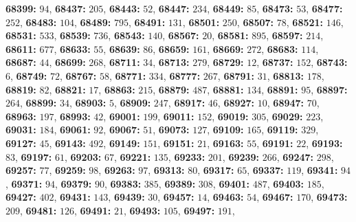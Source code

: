 \textsf{\bfseries 68399:} $94$, \textsf{\bfseries 68437:} $205$, \textsf{\bfseries 68443:} $52$, \textsf{\bfseries 68447:} $234$, \textsf{\bfseries 68449:} $85$, \textsf{\bfseries 68473:} $53$, \textsf{\bfseries 68477:} $252$, \textsf{\bfseries 68483:} $104$, \textsf{\bfseries 68489:} $795$, \textsf{\bfseries 68491:} $131$, \textsf{\bfseries 68501:} $250$, \textsf{\bfseries 68507:} $78$, \textsf{\bfseries 68521:} $146$, \textsf{\bfseries 68531:} $533$, \textsf{\bfseries 68539:} $736$, \textsf{\bfseries 68543:} $140$, \textsf{\bfseries 68567:} $20$, \textsf{\bfseries 68581:} $895$, \textsf{\bfseries 68597:} $214$, \textsf{\bfseries 68611:} $677$, \textsf{\bfseries 68633:} $55$, \textsf{\bfseries 68639:} $86$, \textsf{\bfseries 68659:} $161$, \textsf{\bfseries 68669:} $272$, \textsf{\bfseries 68683:} $114$, \textsf{\bfseries 68687:} $44$, \textsf{\bfseries 68699:} $268$, \textsf{\bfseries 68711:} $34$, \textsf{\bfseries 68713:} $279$, \textsf{\bfseries 68729:} $12$, \textsf{\bfseries 68737:} $152$, \textsf{\bfseries 68743:} $6$, \textsf{\bfseries 68749:} $72$, \textsf{\bfseries 68767:} $58$, \textsf{\bfseries 68771:} $334$, \textsf{\bfseries 68777:} $267$, \textsf{\bfseries 68791:} $31$, \textsf{\bfseries 68813:} $178$, \textsf{\bfseries 68819:} $82$, \textsf{\bfseries 68821:} $17$, \textsf{\bfseries 68863:} $215$, \textsf{\bfseries 68879:} $487$, \textsf{\bfseries 68881:} $134$, \textsf{\bfseries 68891:} $95$, \textsf{\bfseries 68897:} $264$, \textsf{\bfseries 68899:} $34$, \textsf{\bfseries 68903:} $5$, \textsf{\bfseries 68909:} $247$, \textsf{\bfseries 68917:} $46$, \textsf{\bfseries 68927:} $10$, \textsf{\bfseries 68947:} $70$, \textsf{\bfseries 68963:} $197$, \textsf{\bfseries 68993:} $42$, \textsf{\bfseries 69001:} $199$, \textsf{\bfseries 69011:} $152$, \textsf{\bfseries 69019:} $305$, \textsf{\bfseries 69029:} $223$, \textsf{\bfseries 69031:} $184$, \textsf{\bfseries 69061:} $92$, \textsf{\bfseries 69067:} $51$, \textsf{\bfseries 69073:} $127$, \textsf{\bfseries 69109:} $165$, \textsf{\bfseries 69119:} $329$, \textsf{\bfseries 69127:} $45$, \textsf{\bfseries 69143:} $492$, \textsf{\bfseries 69149:} $151$, \textsf{\bfseries 69151:} $21$, \textsf{\bfseries 69163:} $55$, \textsf{\bfseries 69191:} $22$, \textsf{\bfseries 69193:} $83$, \textsf{\bfseries 69197:} $61$, \textsf{\bfseries 69203:} $67$, \textsf{\bfseries 69221:} $135$, \textsf{\bfseries 69233:} $201$, \textsf{\bfseries 69239:} $266$, \textsf{\bfseries 69247:} $298$, \textsf{\bfseries 69257:} $77$, \textsf{\bfseries 69259:} $98$, \textsf{\bfseries 69263:} $97$, \textsf{\bfseries 69313:} $80$, \textsf{\bfseries 69317:} $65$, \textsf{\bfseries 69337:} $119$, \textsf{\bfseries 69341:} $94$, \textsf{\bfseries 69371:} $94$, \textsf{\bfseries 69379:} $90$, \textsf{\bfseries 69383:} $385$, \textsf{\bfseries 69389:} $308$, \textsf{\bfseries 69401:} $487$, \textsf{\bfseries 69403:} $185$, \textsf{\bfseries 69427:} $402$, \textsf{\bfseries 69431:} $143$, \textsf{\bfseries 69439:} $30$, \textsf{\bfseries 69457:} $14$, \textsf{\bfseries 69463:} $54$, \textsf{\bfseries 69467:} $170$, \textsf{\bfseries 69473:} $209$, \textsf{\bfseries 69481:} $126$, \textsf{\bfseries 69491:} $21$, \textsf{\bfseries 69493:} $105$, \textsf{\bfseries 69497:} $191$, 
